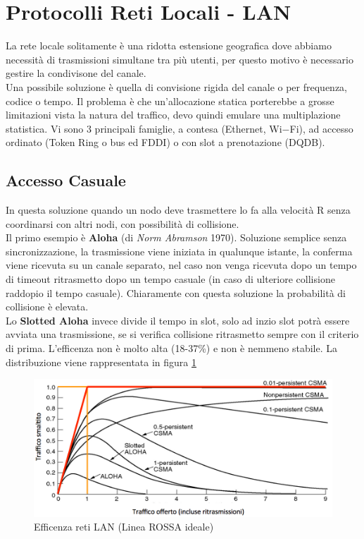 \documentclass[12pt]{article}
\begin{document}
\section{Protocolli Reti Locali - LAN}
La rete locale solitamente è una ridotta estensione geografica dove abbiamo necessità di trasmissioni simultane tra più utenti, per questo motivo è necessario gestire la condivisone del canale.\\
Una possibile soluzione è quella di convisione rigida del canale o per frequenza, codice o tempo. Il problema è che un'allocazione statica porterebbe a grosse limitazioni vista la natura del traffico, devo quindi emulare una multiplazione statistica. Vi sono 3 principali famiglie, a contesa (Ethernet, Wi$-$Fi), ad accesso ordinato (Token Ring o bus ed FDDI) o con slot a prenotazione (DQDB).
\subsection{Accesso Casuale}
In questa soluzione quando un nodo deve trasmettere lo fa alla velocità R senza coordinarsi con altri nodi, con possibilità di collisione.\\
Il primo esempio è \textbf{Aloha} (di \textit{Norm Abramson} 1970). Soluzione semplice senza sincronizzazione, la trasmissione viene iniziata in qualunque istante, la conferma viene ricevuta su un canale separato, nel caso non venga ricevuta dopo un tempo di timeout ritrasmetto dopo un tempo casuale (in caso di ulteriore collisione raddopio il tempo casuale). Chiaramente con questa soluzione la probabilità di collisione è elevata.\\
Lo \textbf{Slotted Aloha} invece divide il tempo in slot, solo ad inzio slot potrà essere avviata una trasmissione, se si verifica collisione ritrasmetto sempre con il criterio di prima. L'efficenza non è molto alta (18-37\%) e non è nemmeno stabile. La distribuzione viene rappresentata in figura \ref{fig:eff_lan}

\begin{figure}[!hp]
  \includegraphics[width=\textwidth]{images/eff_lan.png}
  \caption{Efficenza reti LAN (Linea ROSSA ideale)}
  \label{fig:eff_lan}
\end{figure}
\end{document}

